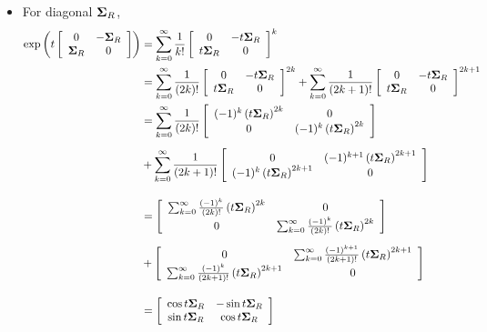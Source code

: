 \documentclass[11pt]{article}
\begin{document}
\begin{itemize}
\item For diagonal $\boldsymbol{\Sigma}_{R}$, 
\begin{align*}
\exp\left(t \left[\begin{array}{cc}
0 & -\boldsymbol{\Sigma}_{R} \\ 
\boldsymbol{\Sigma}_{R}& 0 \\ 
\end{array} \right]\right)
&= \sum_{k=0}^{\infty}\frac{1}{k!}\left[\begin{array}{cc}
0 & -t\boldsymbol{\Sigma}_{R} \\ 
t\boldsymbol{\Sigma}_{R}& 0 \\ 
\end{array} \right]^{k}\\
&= \sum_{k=0}^{\infty}\frac{1}{(2k)!}\left[\begin{array}{cc}
0 & -t\boldsymbol{\Sigma}_{R}  \\ 
t\boldsymbol{\Sigma}_{R}& 0 \\ 
\end{array} \right]^{2k}
+
\sum_{k=0}^{\infty}\frac{1}{(2k+1)!}\left[\begin{array}{cc}
0 & -t\boldsymbol{\Sigma}_{R}  \\ 
t\boldsymbol{\Sigma}_{R}& 0  \\ 
\end{array} \right]^{2k+1}\\
&=\sum_{k=0}^{\infty}\frac{1}{(2k)!}\left[\begin{array}{cc}
(-1)^{k}\left(t\boldsymbol{\Sigma}_{R}\right)^{2k} & 0 \\ 
0& (-1)^{k}\left(t\boldsymbol{\Sigma}_{R}\right)^{2k}  \\ 
\end{array} \right]
\\[5pt]
&+
\sum_{k=0}^{\infty}\frac{1}{(2k+1)!}\left[\begin{array}{cc}
0 & (-1)^{k+1}\left(t\boldsymbol{\Sigma}_{R}\right)^{2k+1} \\ 
(-1)^{k}\left(t\boldsymbol{\Sigma}_{R}\right)^{2k+1}& 0 \\ 
\end{array}\right]\\[10pt]
&= \left[\begin{array}{cc}
\sum_{k=0}^{\infty}\frac{(-1)^{k}}{(2k)!}\left(t\boldsymbol{\Sigma}_{R}\right)^{2k} & 0  \\ 
0& \sum_{k=0}^{\infty}\frac{(-1)^{k}}{(2k)!}\left(t\boldsymbol{\Sigma}_{R}\right)^{2k}  \\ 
\end{array} \right]\\[5pt]
& + \left[\begin{array}{cc}
0 & \sum_{k=0}^{\infty}\frac{(-1)^{k+1}}{(2k+1)!}\left(t\boldsymbol{\Sigma}_{R}\right)^{2k+1} \\ 
\sum_{k=0}^{\infty}\frac{(-1)^{k}}{(2k+1)!}\left(t\boldsymbol{\Sigma}_{R}\right)^{2k+1}& 0 \\ 
\end{array}\right]\\[10pt]
&= \left[\begin{array}{cc}
\cos t\boldsymbol{\Sigma}_{R} & -\sin t\boldsymbol{\Sigma}_{R} \\ 
\sin t\boldsymbol{\Sigma}_{R} & \cos t\boldsymbol{\Sigma}_{R}  \\ 
\end{array}\right]
\end{align*}

\end{itemize}
\end{document}
